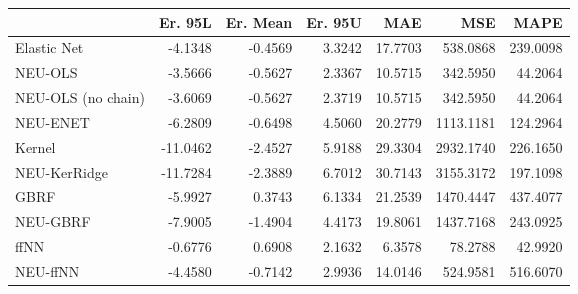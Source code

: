 \begin{tabular}{lrrrrrr}
\toprule
{} &  Er. 95L &  Er. Mean &  Er. 95U &     MAE &       MSE &     MAPE \\
\midrule
Elastic Net        &  -4.1348 &   -0.4569 &   3.3242 & 17.7703 &  538.0868 & 239.0098 \\
NEU-OLS            &  -3.5666 &   -0.5627 &   2.3367 & 10.5715 &  342.5950 &  44.2064 \\
NEU-OLS (no chain) &  -3.6069 &   -0.5627 &   2.3719 & 10.5715 &  342.5950 &  44.2064 \\
NEU-ENET           &  -6.2809 &   -0.6498 &   4.5060 & 20.2779 & 1113.1181 & 124.2964 \\
Kernel             & -11.0462 &   -2.4527 &   5.9188 & 29.3304 & 2932.1740 & 226.1650 \\
NEU-KerRidge       & -11.7284 &   -2.3889 &   6.7012 & 30.7143 & 3155.3172 & 197.1098 \\
GBRF               &  -5.9927 &    0.3743 &   6.1334 & 21.2539 & 1470.4447 & 437.4077 \\
NEU-GBRF           &  -7.9005 &   -1.4904 &   4.4173 & 19.8061 & 1437.7168 & 243.0925 \\
ffNN               &  -0.6776 &    0.6908 &   2.1632 &  6.3578 &   78.2788 &  42.9920 \\
NEU-ffNN           &  -4.4580 &   -0.7142 &   2.9936 & 14.0146 &  524.9581 & 516.6070 \\
\bottomrule
\end{tabular}
